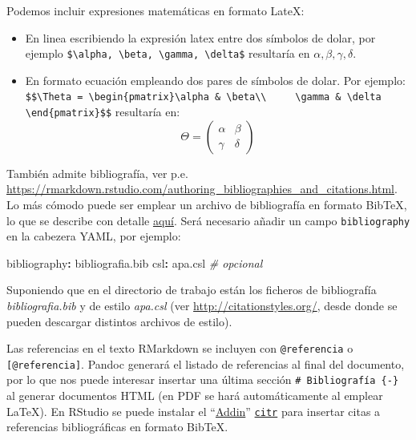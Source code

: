 \documentclass[
]{book}
\newenvironment{Shaded}{\begin{snugshade}}{\end{snugshade}}
\newcommand{\AttributeTok}[1]{\textcolor[rgb]{0.77,0.63,0.00}{#1}}
\newcommand{\CommentTok}[1]{\textcolor[rgb]{0.56,0.35,0.01}{\textit{#1}}}
\newcommand{\FunctionTok}[1]{\textcolor[rgb]{0.00,0.00,0.00}{#1}}
\newcommand{\KeywordTok}[1]{\textcolor[rgb]{0.13,0.29,0.53}{\textbf{#1}}}
\theoremstyle{break}
\theoremstyle{nonumberplain}
\begin{document}
Podemos incluir expresiones matemáticas en formato LateX:

\begin{itemize}
\item
  En linea escribiendo la expresión latex entre dos símbolos de dolar,
  por ejemplo \texttt{\$\textbackslash{}alpha,\ \textbackslash{}beta,\ \textbackslash{}gamma,\ \textbackslash{}delta\$}
  resultaría en \(\alpha, \beta, \gamma, \delta\).
\item
  En formato ecuación empleando dos pares de símbolos de dolar. Por ejemplo:
  \texttt{\$\$\textbackslash{}Theta\ =\ \textbackslash{}begin\{pmatrix\}\textbackslash{}alpha\ \&\ \textbackslash{}beta\textbackslash{}\textbackslash{}\ \ \ \ \ \textbackslash{}gamma\ \&\ \textbackslash{}delta\ \ \ \ \ \textbackslash{}end\{pmatrix\}\$\$}
  resultaría en:
  \[\Theta = \begin{pmatrix}\alpha & \beta\\
  \gamma & \delta
  \end{pmatrix}\]
\end{itemize}

También admite bibliografía, ver p.e. \url{https://rmarkdown.rstudio.com/authoring_bibliographies_and_citations.html}.
Lo más cómodo puede ser emplear un archivo de bibliografía en formato BibTeX,
lo que se describe con detalle \href{https://bookdown.org/yihui/bookdown/citations.html}{aquí}.
Será necesario añadir un campo \texttt{bibliography} en la cabezera YAML, por ejemplo:

\begin{Shaded}
\begin{Highlighting}[]
\FunctionTok{bibliography}\KeywordTok{:}\AttributeTok{ bibliografia.bib}
\FunctionTok{csl}\KeywordTok{:}\AttributeTok{ apa.csl}\CommentTok{  \# opcional}
\end{Highlighting}
\end{Shaded}

Suponiendo que en el directorio de trabajo están los ficheros de bibliografía \emph{bibliografia.bib}
y de estilo \emph{apa.csl} (ver \url{http://citationstyles.org/}, desde donde se pueden descargar
distintos archivos de estilo).

Las referencias en el texto RMarkdown se incluyen con \texttt{@referencia} o \texttt{{[}@referencia{]}}.
Pandoc generará el listado de referencias al final del documento,
por lo que nos puede interesar insertar una última sección \texttt{\#\ Bibliografía\ \{-\}}
al generar documentos HTML (en PDF se hará automáticamente al emplear LaTeX).
En RStudio se puede instalar el ``\href{https://rstudio.github.io/rstudioaddins/}{Addin}''
\href{https://github.com/crsh/citr}{\texttt{citr}} para insertar
citas a referencias bibliográficas en formato BibTeX.
\end{document}
